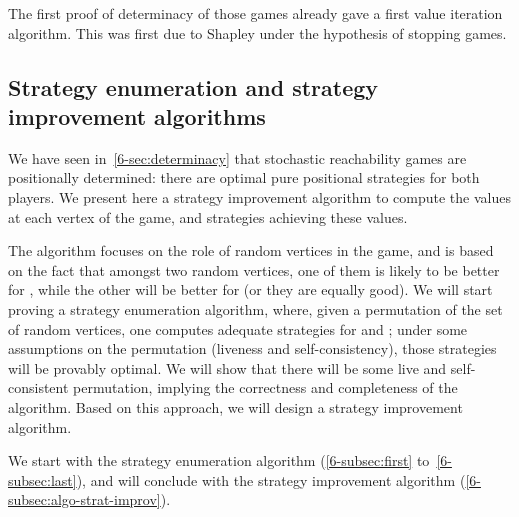 The first proof of determinacy of those games already gave a first
value iteration algorithm. This was first due to Shapley under the
hypothesis of stopping games.



\subsection{Strategy enumeration and strategy improvement algorithms}

%


We have seen in~\cref{6-sec:determinacy} that stochastic
reachability games are positionally determined: there are optimal
 pure positional strategies for both players. We present here a
strategy improvement algorithm to compute the values at each vertex of
the game, and strategies achieving these values.

The algorithm focuses on the role of random vertices in the game, and
is based on the fact that amongst two random vertices, one of them is
likely to be better for \Eve, while the other will be better for \Adam
(or they are equally good). We will start proving a strategy
enumeration algorithm, where, given a permutation of the set of random
vertices, one computes adequate strategies for \Eve and \Adam; under
some assumptions on the permutation (liveness and self-consistency),
those strategies will be provably optimal. We will show that there
will be some live and self-consistent permutation, implying the
correctness and completeness of the algorithm. Based on this approach,
we will design a strategy improvement algorithm.

We start with the strategy enumeration algorithm
(\cref{6-subsec:first} to~\cref{6-subsec:last}), and will
conclude with the strategy improvement algorithm
(\cref{6-subsec:algo-strat-improv}).



